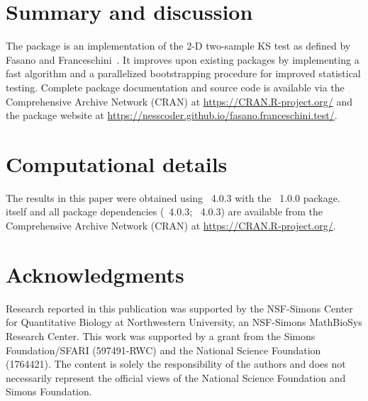 \documentclass[codesnippet]{jss}
\newcommand{\RBnote}[1]{\textcolor{red}{#1}}
\begin{document}

\section{Summary and discussion} \label{sec:summary}

The  package is an  implementation of the 2-D two-sample KS test as defined by Fasano and Franceschini~\citep{Fasano1987}.
It improves upon existing packages by implementing
  a fast algorithm and
  a parallelized bootstrapping procedure for improved statistical testing.
  Complete package documentation and source code is available via the Comprehensive
 Archive Network (CRAN) at
\url{https://CRAN.R-project.org/} and the package website at \url{https://nesscoder.github.io/fasano.franceschini.test/}.



\section*{Computational details}


The results in this paper were obtained using
~4.0.3 with the
~1.0.0 package.  itself
and all package dependencies (~4.0.3; ~4.0.3) are available from the Comprehensive
 Archive Network (CRAN) at
\url{https://CRAN.R-project.org/}.


\section*{Acknowledgments}

Research reported in this publication was supported by the NSF-Simons Center for Quantitative Biology at Northwestern University, an NSF-Simons MathBioSys Research Center. This work was supported by a grant from the Simons Foundation/SFARI (597491-RWC) and the National Science Foundation (1764421). The content is solely the responsibility of the authors and does not necessarily represent the official views of the National Science Foundation and Simons Foundation.
\end{document}
